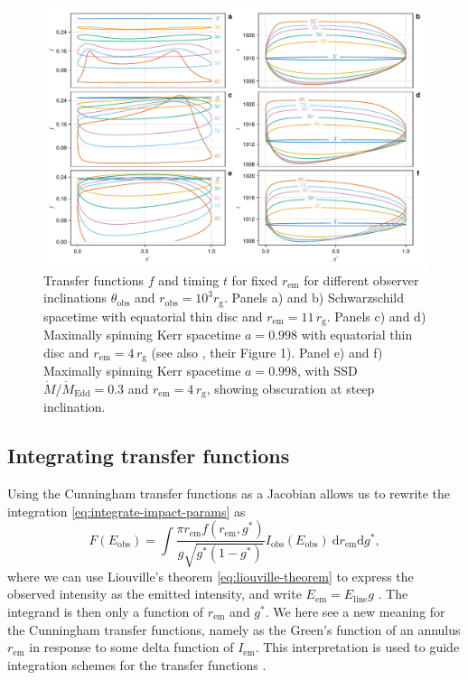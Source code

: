 \documentclass[fleqn,usenatbib]{mnras}
\renewcommand{\d}{\text{d}}
\newcommand{\rg}{r_\text{g}}
\begin{document}
\begin{figure}
    \centering
    \includegraphics[width=0.99\linewidth]{figures/transfer-functions.plots.pdf}
    \caption{Transfer functions $f$ and timing $t$ for fixed $r_\text{em}$ for different observer inclinations $\theta_\text{obs}$ and $r_\text{obs} = 10^3 \rg$. Panels a) and b) Schwarzschild spacetime with equatorial thin disc and $r_\text{em} = 11\, \rg$. Panels c) and d) Maximally spinning Kerr spacetime $a=0.998$ with equatorial thin disc and $r_\text{em} = 4 \, \rg$ (see also \citealp{bambi_testing_2017}, their Figure 1). Panel e) and f) Maximally spinning Kerr spacetime $a=0.998$, with SSD $\dot{M} / \dot{M}_\text{Edd} = 0.3$ and $r_\text{em} = 4\, \rg$, showing obscuration at steep inclination.}
    \label{fig:transfer-functions}
\end{figure}

\subsection{Integrating transfer functions}
\label{sec:transfer-function-integration}

Using the Cunningham transfer functions as a Jacobian allows us to rewrite the
integration \eqref{eq:integrate-impact-params} as
\begin{equation}
    F(E_\text{obs}) = \int \frac{\pi r_\text{em} f(r_\text{em}, g^\ast)}{g \sqrt{g^\ast (1 - g^\ast)}}
    I_\text{obs}(E_\text{obs}) \ \d r_\text{em} \d g^\ast,
\end{equation}
where we can use Liouville's theorem \eqref{eq:liouville-theorem} to express the
observed intensity as the emitted intensity, and write $E_\text{em} =
E_\text{line}g$ . The integrand is then only a function of $r_\text{em}$ and
$g^\ast$. We here see a new meaning for the Cunningham transfer functions,
namely as the Green's function of an annulus $r_\text{em}$ in response to some
delta function of $I_\text{em}$. This interpretation is used to guide
integration schemes for the transfer functions \citep{dauser_broad_2010}.
\end{document}

